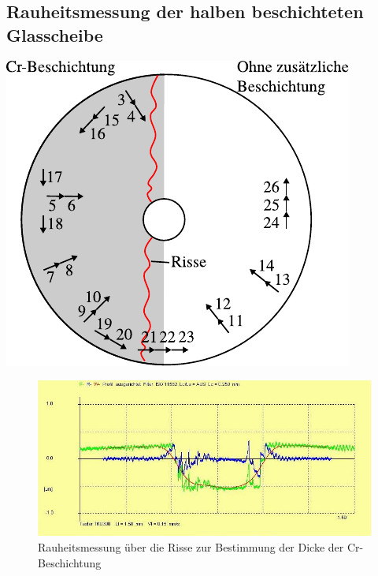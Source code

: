 \begin{appendices}
    \section{Rauheitsmessung der halben beschichteten Glasscheibe}
    \begin{minipage}[b]{0.5\linewidth}
        \centering
        \includegraphics[width=\textwidth]{./images/rauheitsmessung.pdf}
        \label{fig:messstelle_zur_rauheitsbestimmung}
    \end{minipage}
    \begin{minipage}[b]{0.5\linewidth}
        \centering
        
    \end{minipage}

    \begin{figure}[htb]
        \centering
        \includegraphics[width=\linewidth]{./images/rauheit_messung_21_plot.jpg}
        \caption{Rauheitsmessung über die Risse zur Bestimmung der Dicke der Cr-Beschichtung}
        \label{fig:rauheitsmessung_ueber_der_risse}
    \end{figure}


\end{appendices}
